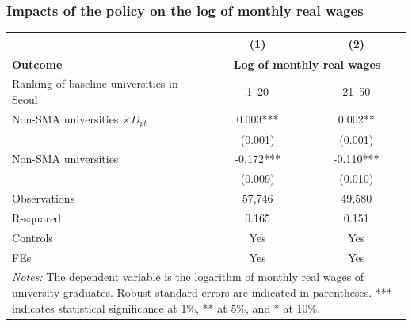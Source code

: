 \documentclass[aspectratio=169,xcolor=dvipsnames,handout]{beamer}
\begin{document}
\begin{frame}
    \frametitle{Impacts of the policy on the log of monthly real wages }
    \begin{table}[ht]
        \scriptsize
        \centering
        \begin{tabular}{lcc}
        \toprule
        & \textbf{(1)} & \textbf{(2)} \\
        \midrule
        \textbf{Outcome} & \multicolumn{2}{c}{\textbf{Log of monthly real wages}} \\
        \midrule
        Ranking of baseline universities in Seoul & 1--20     & 21--50  \\
        \midrule                                                                                  
        Non-SMA universities $\times D_{pt}$      & 0.003***  & 0.002**   \\
                                                  & (0.001)   & (0.001)   \\
        Non-SMA universities                      & -0.172*** & -0.110*** \\
                                                  & (0.009)   & (0.010)   \\
        \midrule                                                          
        Observations                              & 57,746    & 49,580    \\
        R-squared                                 & 0.165     & 0.151     \\
        Controls                                  & Yes       & Yes       \\
        FEs                                       & Yes       & Yes       \\
        \bottomrule
        \multicolumn{3}{p{9cm}}{\tiny\textit{Notes:} The dependent variable is the logarithm of monthly real wages of university graduates\@. Robust standard errors are indicated in parentheses. *** indicates statistical significance at 1\%, ** at 5\%, and * at 10\%.} \\
        \end{tabular}
    \end{table}
\end{frame}
\end{document}
